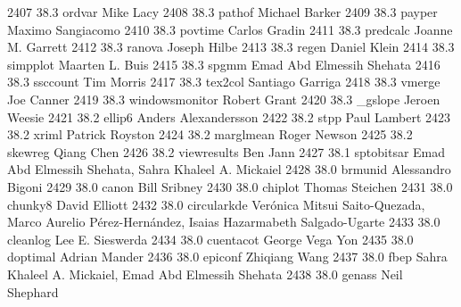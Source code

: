   2407     38.3    ordvar        Mike Lacy                               
  2408     38.3    pathof        Michael Barker                          
  2409     38.3    payper        Maximo Sangiacomo                       
  2410     38.3    povtime       Carlos Gradin                           
  2411     38.3    predcalc      Joanne M. Garrett                       
  2412     38.3    ranova        Joseph Hilbe                            
  2413     38.3    regen         Daniel Klein                            
  2414     38.3    simpplot      Maarten L. Buis                         
  2415     38.3    spgmm         Emad Abd Elmessih Shehata               
  2416     38.3    ssccount      Tim Morris                              
  2417     38.3    tex2col       Santiago Garriga                        
  2418     38.3    vmerge        Joe Canner                              
  2419     38.3    windowsmonitor  Robert Grant                            
  2420     38.3    _gslope       Jeroen Weesie                           
  2421     38.2    ellip6        Anders Alexandersson                    
  2422     38.2    stpp          Paul Lambert                            
  2423     38.2    xriml         Patrick Royston                         
  2424     38.2    marglmean     Roger Newson                            
  2425     38.2    skewreg       Qiang Chen                              
  2426     38.2    viewresults   Ben Jann                                
  2427     38.1    sptobitsar    Emad Abd Elmessih Shehata, Sahra        
                                   Khaleel A. Mickaiel                     
  2428     38.0    brmunid       Alessandro Bigoni                       
  2429     38.0    canon         Bill Sribney                            
  2430     38.0    chiplot       Thomas Steichen                         
  2431     38.0    chunky8       David Elliott                           
  2432     38.0    circularkde   Verónica Mitsui Saito-Quezada, Marco   
                                   Aurelio Pérez-Hernández, Isaias       
                                   Hazarmabeth Salgado-Ugarte              
  2433     38.0    cleanlog      Lee E. Sieswerda                        
  2434     38.0    cuentacot     George Vega Yon                         
  2435     38.0    doptimal      Adrian Mander                           
  2436     38.0    epiconf       Zhiqiang Wang                           
  2437     38.0    fbep          Sahra Khaleel A. Mickaiel, Emad Abd     
                                   Elmessih Shehata                        
  2438     38.0    genass        Neil Shephard                           
